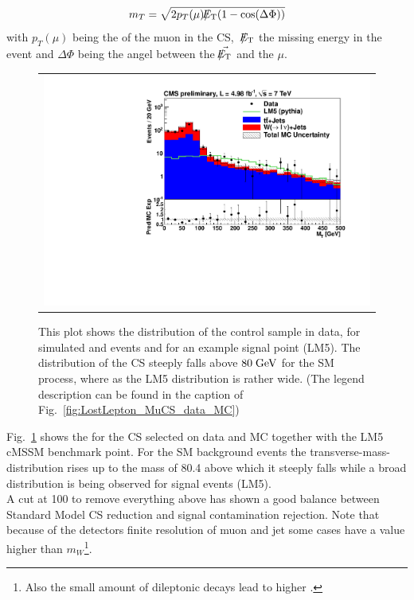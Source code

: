  \begin{equation}
 m_{T} = \sqrt{2 p_{T}(\mu) \slash\mkern-12mu{E}_{\text{T}} (1 - \cos(\Delta \Phi))}
\label{eq:mt}
\end{equation}
with $p_{T}(\mu)$ being the \pt of the muon in the CS, $\hspace{1mm} \slash\mkern-12mu{E}_{\text{T}}$ the missing energy in the event and $\Delta \Phi$ being the angel between the $\vec{\slash\mkern-12mu{E}_{\text{T}}}$ and the $\mu$.\\
\begin{figure}[tbhn]
\begin{center}
\begin{tabular}{c}
\includegraphics[width=1\textwidth]{lostlepton/plots/ANplots/Control_MTW.pdf}\\
\end{tabular}
\end{center}
\caption{This plot shows the \mt distribution of the control sample in data, for simulated \ttbar and \wpj events and for an example signal point (LM5). The \mt distribution of the CS steeply falls above $80 \;\text{Ge}\kern-0.06667em\text{V}$ for the SM process, where as the LM5 distribution is rather wide. (The legend description can be found in the caption of Fig.~\ref{fig:LostLepton_MuCS_data_MC})}
\label{fig:control_mtw}
\end{figure}
Fig.~\ref{fig:control_mtw} shows the \mt for the CS selected on data and MC together with the LM5 cMSSM benchmark point.
For the SM background events the transverse-mass-distribution rises up to the \w mass of 80.4 \gev above which it steeply falls while a broad distribution is being observed for signal events (LM5).\\
A cut at 100 \gev to remove everything above has shown a good balance between Standard Model CS reduction and signal contamination rejection. Note that because of the detectors finite resolution of muon and jet \pt some cases have a \mt value higher than $m_W$\footnote{Also the small amount of dileptonic \ttbar decays lead to higher \mt.}.\\
